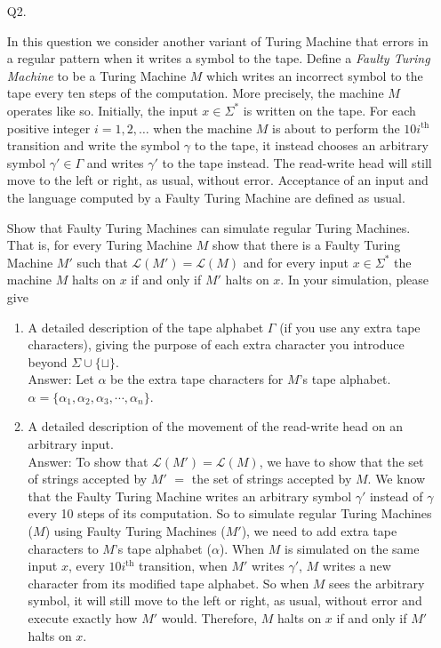 \documentclass{csc_assignment}
\begin{document}
\begin{description}
\begin{enumerate}
\item[Q2.]

In this question we consider another variant of Turing Machine that errors in a regular pattern when it writes a symbol to the tape.
  Define a \emph{Faulty Turing Machine} to be a Turing Machine $M$ which writes an incorrect symbol to the tape every ten steps of the computation.
  More precisely, the machine $M$ operates like so. Initially, the input $x \in \Sigma^*$ is written on the tape.
  For each positive integer $i = 1, 2, \ldots$ when the machine $M$ is about to perform the $10i^{\text{th}}$ transition and write the symbol $\gamma$ to the tape, it instead chooses an arbitrary symbol $\gamma' \in \Gamma$ and writes $\gamma'$ to the tape instead.
  The read-write head will still move to the left or right, as usual, without error.
  Acceptance of an input and the language computed by a Faulty Turing Machine are defined as usual.

  Show that Faulty Turing Machines can simulate regular Turing Machines.
  That is, for every Turing Machine $M$ show that there is a Faulty Turing Machine $M'$ such that $\mathcal{L}(M') = \mathcal{L}(M)$ and for every input $x \in \Sigma^*$ the machine $M$ halts on $x$ if and only if $M'$ halts on $x$.
  In your simulation, please give
  \begin{enumerate}
  \item A detailed description of the tape alphabet $\Gamma$ (if you use any extra tape characters), giving the purpose of each extra character you introduce beyond $\Sigma \cup \{\sqcup\}$.\\
  Answer: Let $\alpha$ be the extra tape characters for $M$'s tape alphabet. $\alpha = \{\alpha_1, \alpha_2, \alpha_3, \cdots, \alpha_n \}$.
  \item A detailed description of the movement of the read-write head on an arbitrary input.\\
  Answer: To show that $\mathcal{L}(M') = \mathcal{L}(M)$, we have to show that the set of strings accepted by $M'$ $=$ the set of strings accepted by $M$. We know that the Faulty Turing Machine writes an arbitrary symbol $\gamma'$ instead of $\gamma$ every 10 steps of its computation. So to simulate regular Turing Machines ($M$) using Faulty Turing Machines ($M'$), we need to add extra tape characters to $M$'s tape alphabet ($\alpha$). When $M$ is simulated on the same input $x$, every $10i^{\text{th}}$ transition, when $M'$ writes $\gamma'$, $M$ writes a new character from its modified tape alphabet. So when $M$ sees the arbitrary symbol, it will still move to the left or right, as usual, without error and execute exactly how $M'$ would. Therefore, $M$ halts on $x$ if and only if $M'$ halts on $x$.
  \end{enumerate}


\end{enumerate}
\end{description}
\end{document}
